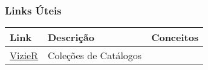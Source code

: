 \subsubsection{Links Úteis}

\bigskip\noindent
\begin{tabular}{p{}p{}p{}}
\toprule
Link & Descrição & Conceitos \\
\hline
\href{https://simbad.cds.unistra.fr/simbad/}{VizieR} & Coleções  de Catálogos &  \\
\bottomrule
\end{tabular}

\bigskip